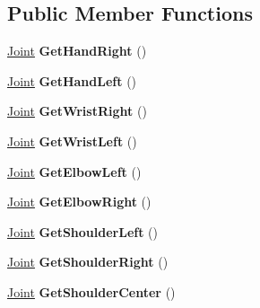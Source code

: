 \subsection*{Public Member Functions}
\begin{DoxyCompactItemize}
\item 
\hypertarget{classSkeleton_a5cf8063cef35fc97636bff0adfef5a6f}{
\hyperlink{structSkeleton_1_1Joint}{Joint} {\bfseries GetHandRight} ()}
\label{classSkeleton_a5cf8063cef35fc97636bff0adfef5a6f}

\item 
\hypertarget{classSkeleton_a9bc61828adf48ee561e2a67db821e414}{
\hyperlink{structSkeleton_1_1Joint}{Joint} {\bfseries GetHandLeft} ()}
\label{classSkeleton_a9bc61828adf48ee561e2a67db821e414}

\item 
\hypertarget{classSkeleton_a5da8ee369451604f677570e7e294b80e}{
\hyperlink{structSkeleton_1_1Joint}{Joint} {\bfseries GetWristRight} ()}
\label{classSkeleton_a5da8ee369451604f677570e7e294b80e}

\item 
\hypertarget{classSkeleton_a0b58f09eb76b6b76b22a8e5b0a0a2cd2}{
\hyperlink{structSkeleton_1_1Joint}{Joint} {\bfseries GetWristLeft} ()}
\label{classSkeleton_a0b58f09eb76b6b76b22a8e5b0a0a2cd2}

\item 
\hypertarget{classSkeleton_a794fd9e79247be88885cdd635c7893b0}{
\hyperlink{structSkeleton_1_1Joint}{Joint} {\bfseries GetElbowLeft} ()}
\label{classSkeleton_a794fd9e79247be88885cdd635c7893b0}

\item 
\hypertarget{classSkeleton_aca2ed8209b8c28f3fcff246f23bbee2e}{
\hyperlink{structSkeleton_1_1Joint}{Joint} {\bfseries GetElbowRight} ()}
\label{classSkeleton_aca2ed8209b8c28f3fcff246f23bbee2e}

\item 
\hypertarget{classSkeleton_ab9659851d80e458ae07a5281f1396829}{
\hyperlink{structSkeleton_1_1Joint}{Joint} {\bfseries GetShoulderLeft} ()}
\label{classSkeleton_ab9659851d80e458ae07a5281f1396829}

\item 
\hypertarget{classSkeleton_a4bedbf33673474b6e7949d8c4f9893f2}{
\hyperlink{structSkeleton_1_1Joint}{Joint} {\bfseries GetShoulderRight} ()}
\label{classSkeleton_a4bedbf33673474b6e7949d8c4f9893f2}

\item 
\hypertarget{classSkeleton_a34de381e40dcc1cc38bfa840a7a69506}{
\hyperlink{structSkeleton_1_1Joint}{Joint} {\bfseries GetShoulderCenter} ()}
\label{classSkeleton_a34de381e40dcc1cc38bfa840a7a69506}


\end{DoxyCompactItemize}
